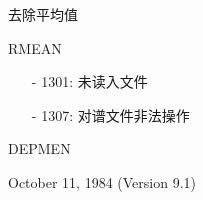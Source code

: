 \label{cmd:rmean}

去除平均值

RMEAN

\begin{itemize}
\item[-]1301: 未读入文件
\item[-]1307: 对谱文件非法操作
\end{itemize}

DEPMEN

October 11, 1984 (Version 9.1)
